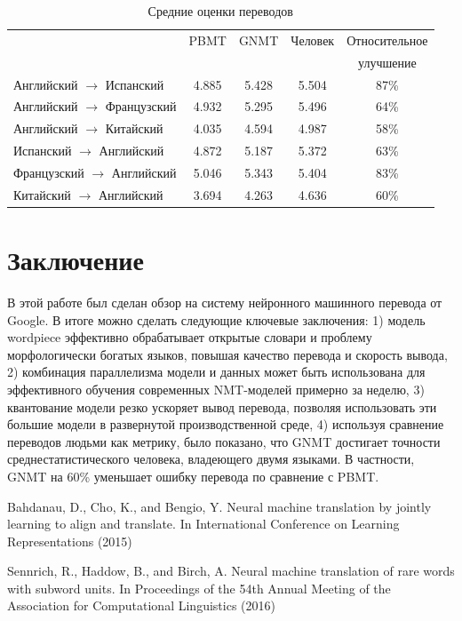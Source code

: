 \documentclass[12pt, a4paper]{article}
\begin{document}
        \begin{table}[h!]
        \centering
        \begin{tabular}{l c c c c}
            \hline
            \hline
            & PBMT & GNMT & Человек & Относительное \\
            & & & & улучшение \\
            \hline
            Английский $\rightarrow$ Испанский & 4.885 & 5.428 & 5.504 & 87\% \\
            Английский $\rightarrow$ Французский & 4.932 & 5.295 & 5.496 & 64\% \\
            Английский $\rightarrow$ Китайский & 4.035 & 4.594 & 4.987 & 58\% \\
            Испанский $\rightarrow$ Английский & 4.872 & 5.187 & 5.372 & 63\% \\
            Французский $\rightarrow$ Английский & 5.046 & 5.343 & 5.404 & 83\% \\
            Китайский $\rightarrow$ Английский & 3.694 & 4.263 & 4.636 & 60\% \\
            \hline
        \end{tabular}
        \caption{Средние оценки переводов}
        \label{table:trans_test}
        \end{table}

    \section{Заключение}
        В этой работе был сделан обзор на систему нейронного машинного перевода от Google. В итоге можно сделать следующие ключевые заключения: 1) модель wordpiece эффективно обрабатывает открытые словари и проблему морфологически богатых языков, повышая качество перевода и скорость вывода, 2) комбинация параллелизма модели и данных может быть использована для эффективного обучения современных NMT-моделей примерно за неделю, 3) квантование модели резко ускоряет вывод перевода, позволяя использовать эти большие модели в развернутой производственной среде, 4) используя сравнение переводов людьми как метрику, было показано, что GNMT достигает точности среднестатистического человека, владеющего двумя языками. В частности, GNMT на 60\% уменьшает ошибку перевода по сравнение с PBMT.

    \begin{thebibliography}{1}
        Bahdanau, D., Cho, K., and Bengio, Y. Neural machine translation by jointly learning to align and translate. In International Conference on Learning Representations (2015)

        Sennrich, R., Haddow, B., and Birch, A. Neural machine translation of rare words with subword units. In Proceedings of the 54th Annual Meeting of the Association for Computational Linguistics (2016)
    \end{thebibliography}
\end{document}
